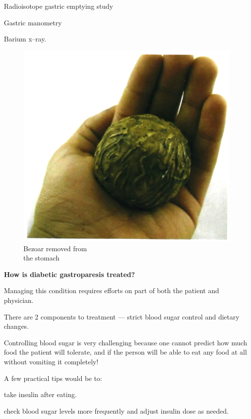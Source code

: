 {\item Radioisotope gastric emptying study

 \item Gastric manometry

 \item Barium x–ray.


\begin{figure}
\includegraphics{images/077.jpg}
\caption{Bezoar removed from\\ the stomach}
\end{figure}

\textbf{How is diabetic gastroparesis treated?}

Managing this condition requires efforts on part of both the patient and physician.

There are 2 components to treatment — strict blood sugar control and dietary changes.

Controlling blood sugar is very challenging because one cannot predict how much food the patient will tolerate, and if the person will be able to eat any food at all without vomiting it completely!

A few practical tips would be to:

\item take insulin after eating.

 \item check blood sugar levels more frequently and adjust insulin dose as needed.

}
